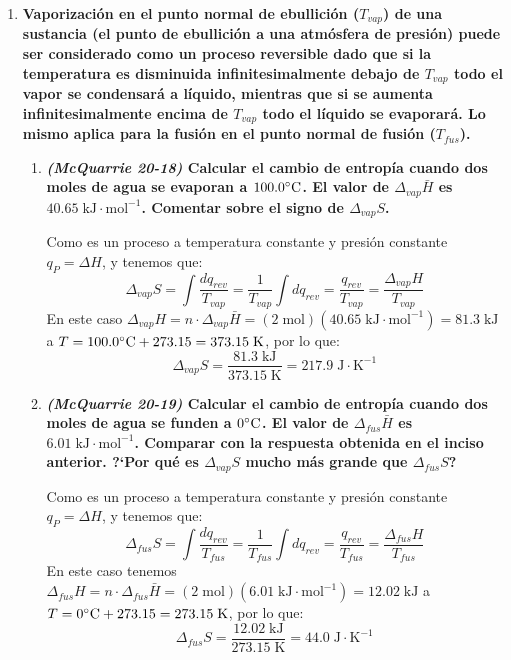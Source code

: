 \documentclass[a4paper,12pt]{article}
\begin{document}
\begin{enumerate}
Para determinar el cambio de entrop\'ia de los alrededores, necesitamos determinar $q_{alr}=-q_{sis}$. Para una expansi\'on en contra del vac\'io se tiene que $w=0$. Como es un gas ideal y la expansi\'on es isot\'ermica, $\Delta U=q+w=0\;\Rightarrow\;q_{sis}=0=-q_{alr}$, as\'i que:
$$\Delta S_{alr}=\frac{q_{alr}}{T_{alr}}=0$$

Por lo que el cambio de entrop\'ia total es:
$$\Delta S_{tot}=\Delta S_{alr}+\Delta S_{sis}=0+13.4\;\mbox{J}\cdot\mbox{K}^{-1}=+13.4\;\mbox{J}\cdot\mbox{K}^{-1}$$

 \item \textbf{Vaporizaci\'on en el punto normal de ebullici\'on ($T_{vap}$) de una sustancia (el punto de ebullici\'on a una atm\'osfera de presi\'on) puede ser considerado como un proceso reversible dado que si la temperatura es disminuida infinitesimalmente debajo de $T_{vap}$ todo el vapor se condensar\'a a l\'iquido, mientras que si se aumenta infinitesimalmente encima de $T_{vap}$ todo el l\'iquido se evaporar\'a. Lo mismo aplica para la fusi\'on en el punto normal de fusi\'on ($T_{fus}$).}
\begin{enumerate}
 \item \textbf{\textit{(McQuarrie 20-18)} Calcular el cambio de entrop\'ia cuando dos moles de agua se evaporan a $100.0\celsius$. El valor de $\Delta_{vap}\bar{H}$ es $40.65\;\mbox{kJ}\cdot\mbox{mol}^{-1}$. Comentar sobre el signo de $\Delta_{vap}S$.} %

Como es un proceso a temperatura constante y presi\'on constante $q_P=\Delta H$, y tenemos que:
$$\Delta_{vap}S=\int\frac{dq_{rev}}{T_{vap}}=\frac{1}{T_{vap}}\int dq_{rev}=\frac{q_{rev}}{T_{vap}}=\frac{\Delta_{vap}H}{T_{vap}}$$
En este caso $\Delta_{vap}H=n\cdot\Delta_{vap}\bar{H}=(2\;\mbox{mol})(40.65\;\mbox{kJ}\cdot\mbox{mol}^{-1})=81.3\;\mbox{kJ}$ a $T=100.0\celsius+273.15=373.15\;\mbox{K}$, por lo que:
$$\Delta_{vap}S=\frac{81.3\;\mbox{kJ}}{373.15\;\mbox{K}}=217.9\;\mbox{J}\cdot\mbox{K}^{-1}$$

 \item \textbf{\textit{(McQuarrie 20-19)} Calcular el cambio de entrop\'ia cuando dos moles de agua se funden a $0\celsius$. El valor de $\Delta_{fus}\bar{H}$ es $6.01\;\mbox{kJ}\cdot\mbox{mol}^{-1}$. Comparar con la respuesta obtenida en el inciso anterior. ?`Por qu\'e es $\Delta_{vap}S$ mucho m\'as grande que $\Delta_{fus}S$?} %

Como es un proceso a temperatura constante y presi\'on constante $q_P=\Delta H$, y tenemos que:
$$\Delta_{fus}S=\int\frac{dq_{rev}}{T_{fus}}=\frac{1}{T_{fus}}\int dq_{rev}=\frac{q_{rev}}{T_{fus}}=\frac{\Delta_{fus}H}{T_{fus}}$$
En este caso tenemos $\Delta_{fus}H=n\cdot\Delta_{fus}\bar{H}=(2\;\mbox{mol})(6.01\;\mbox{kJ}\cdot\mbox{mol}^{-1})=12.02\;\mbox{kJ}$ a $T=0\celsius+273.15=273.15\;\mbox{K}$, por lo que:
$$\Delta_{fus}S=\frac{12.02\;\mbox{kJ}}{273.15\;\mbox{K}}=44.0\;\mbox{J}\cdot\mbox{K}^{-1}$$


\end{enumerate}
\end{enumerate}
\end{document}

